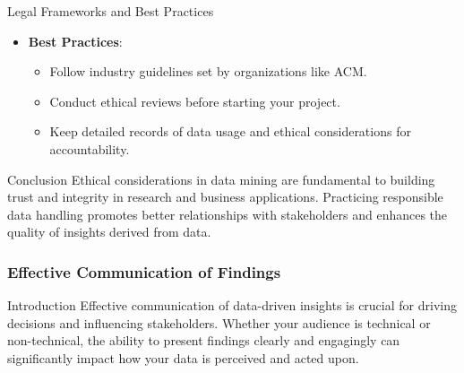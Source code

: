 \documentclass{beamer}
\begin{document}
\begin{frame}[fragile]
\begin{block}{Legal Frameworks and Best Practices}
\begin{itemize}
            \item \textbf{Best Practices}:
            \begin{itemize}
                \item Follow industry guidelines set by organizations like ACM.
                \item Conduct ethical reviews before starting your project.
                \item Keep detailed records of data usage and ethical considerations for accountability.
            \end{itemize}
        \end{itemize}
    \end{block}
    
    \begin{block}{Conclusion}
        Ethical considerations in data mining are fundamental to building trust and integrity in research and business applications. 
        Practicing responsible data handling promotes better relationships with stakeholders and enhances the quality of insights derived from data.
    \end{block}
\end{frame}

\begin{frame}[fragile]
    \frametitle{Effective Communication of Findings}
    \begin{block}{Introduction}
        Effective communication of data-driven insights is crucial for driving decisions and influencing stakeholders. Whether your audience is technical or non-technical, the ability to present findings clearly and engagingly can significantly impact how your data is perceived and acted upon.
    \end{block}
\end{frame}
\end{document}
